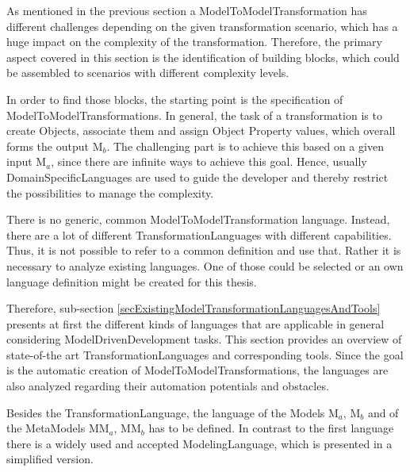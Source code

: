 
As mentioned in the previous section a \gls{ModelToModelTransformation} has different challenges depending on the given transformation scenario, which has a huge impact on the complexity of the transformation. Therefore, the primary aspect covered in this section is the identification of building blocks, which could be assembled to scenarios with different complexity levels.

In order to find those blocks, the starting point is the specification of \glspl{ModelToModelTransformation}. In general, the task of a transformation is to create \glspl{Object}, associate them and assign \gls{Object} \gls{Property} values, which overall forms the output M$_b$. The challenging part is to achieve this based on a given input M$_a$, since there are infinite ways to achieve this goal. Hence, usually \glspl{DomainSpecificLanguage} are used to guide the developer and thereby restrict the possibilities to manage the complexity.


There is no generic, common \gls{ModelToModelTransformation} language. Instead, there are a lot of different \glspl{TransformationLanguage} with different capabilities. Thus, it is not possible to refer to a common definition and use that. Rather it is necessary to analyze existing languages. One of those could be selected or an own language definition might be created for this thesis. 

Therefore, sub-section \ref{secExistingModelTransformationLanguagesAndTools} presents at first the different kinds of languages that are applicable in general considering \gls{ModelDrivenDevelopment} tasks. This section provides an overview of state-of-the art \glspl{TransformationLanguage} and corresponding tools. Since the goal is the automatic creation of \glspl{ModelToModelTransformation}, the languages are also analyzed regarding their automation potentials and obstacles.

Besides the \gls{TransformationLanguage}, the language of the \glspl{Model} M$_a$, M$_b$ and of the \glspl{MetaModel} MM$_a$, MM$_b$ has to be defined. In contrast to the first language there is a widely used and accepted \gls{ModelingLanguage}, which is presented in a simplified version.


